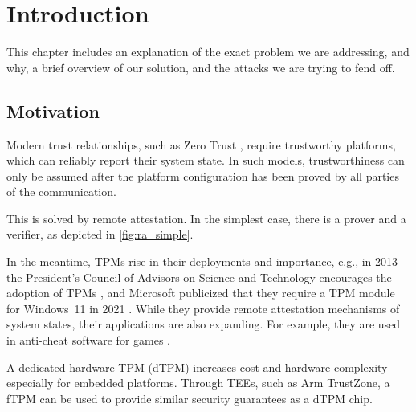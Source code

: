 
\chapter{Introduction}\label{chapter:introduction}

This chapter includes an explanation of the exact problem we are addressing, and why, a brief overview of our solution, and the attacks we are trying to fend off.


\section{Motivation}


Modern trust relationships, such as Zero Trust \cite{isaca2021}, require trustworthy platforms, which can reliably report their system state.
In such models, trustworthiness can only be assumed after the platform configuration has been proved by all parties of the communication.


This is solved by remote attestation. In the simplest case, there is a prover and a verifier, as depicted in \autoref{fig:ra_simple}.




In the meantime, \acp{TPM} rise in their deployments and importance, e.g., in 2013 the President's Council of Advisors on Science and Technology encourages the adoption of TPMs \cite{usa}, and Microsoft publicized that they require a TPM module for Windows~11 in 2021 \cite{win11req}.
While they provide remote attestation mechanisms of system states, their applications are also expanding. For example, they are used in anti-cheat software for games \cite{valorant}.


A dedicated hardware \ac{TPM} (dTPM) increases cost and hardware complexity - especially for embedded platforms.
Through \acp{TEE}, such as Arm TrustZone, a \ac{fTPM} can be used to provide similar security guarantees as a dTPM chip.

